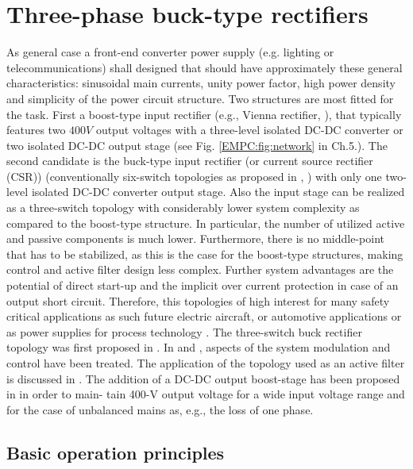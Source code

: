 \section{Three-phase buck-type rectifiers}
	
As  general case a front-end  converter power supply (e.g. lighting or telecommunications) shall designed that should have approximately these general characteristics: sinusoidal main currents, unity power factor, high power density and simplicity of the power circuit structure. Two structures are most fitted for the task. First a boost-type input rectifier (e.g., Vienna rectifier, \cite{kolar1996design}), that typically features two $400V$ output voltages with a three-level isolated  DC-DC  converter  or  two  isolated  DC-DC  output  stage (see Fig. \ref{EMPC:fig:network} in Ch.5.). The second candidate is the buck-type  input  rectifier (or current source rectifier (CSR))  (conventionally  six-switch topologies as proposed in \cite{zargari1993current}, \cite{sato1993state}) with only one two-level isolated  DC-DC  converter  output  stage.  Also the  input  stage  can be realized as a three-switch topology with considerably  lower  system  complexity  as  compared  to  the boost-type structure. In particular, the number of utilized active and passive components is much lower. Furthermore, there is no middle-point that has to be stabilized, as this is the case for the boost-type structures, making control and active filter design less complex. Further system advantages are the potential of direct start-up and the implicit over current protection in case of an output short circuit. Therefore, this topologies of high interest for many safety critical applications as such future electric aircraft, or automotive applications or as power supplies for process technology \cite{nussbaumer2007comprehensive}.
The three-switch buck rectifier topology was first proposed in \cite{malesani1987three}. In \cite{itoh1989steady} and \cite{tooth2000effects}, aspects of the system modulation and control have been treated. The application of the topology used as an active filter is discussed in \cite{salo2005three}.  The addition of a DC-DC output boost-stage has been proposed in \cite{baumannnew} in order to main- tain 400-V output voltage for a wide input voltage range and for the case of unbalanced mains as, e.g., the loss of one phase.

\subsection{Basic operation principles}

